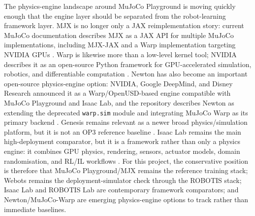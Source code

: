 The physics-engine landscape around MuJoCo Playground is moving quickly enough that the engine layer should be separated from the robot-learning framework layer. MJX is no longer only a JAX reimplementation story: current MuJoCo documentation describes MJX as a JAX API for multiple MuJoCo implementations, including MJX-JAX and a Warp implementation targeting NVIDIA GPUs \citep{GoogleDeepMind2026-mujoco-xla-mjx-documentation}. Warp is likewise more than a low-level kernel tool; NVIDIA describes it as an open-source Python framework for GPU-accelerated simulation, robotics, and differentiable computation \citep{NVIDIA2026-warp-gpu-accelerated-simulation-robotics-machine-learning}. Newton has also become an important open-source physics-engine option: NVIDIA, Google DeepMind, and Disney Research announced it as a Warp/OpenUSD-based engine compatible with MuJoCo Playground and Isaac Lab, and the repository describes Newton as extending the deprecated \texttt{warp.sim} module and integrating MuJoCo Warp as its primary backend \citep{NVIDIA2026-newton-open-source-physics-engine-robotics-simulation,NewtonPhysicsContributors2026-newton-open-source-gpu-accelerated-physics-simulation-engine}. Genesis remains relevant as a newer broad physics/simulation platform, but it is not an OP3 reference baseline \citep{GenesisAuthors2024-genesis-generative-universal-physics-engine-robotics-beyond}. Isaac Lab remains the main high-deployment comparator, but it is a framework rather than only a physics engine: it combines GPU physics, rendering, sensors, actuator models, domain randomisation, and RL/IL workflows \citep{Mittal2025-isaac-lab-gpu-accelerated-simulation-framework-multi-modal-robot-learning}. For this project, the conservative position is therefore that MuJoCo Playground/MJX remains the reference training stack; Webots remains the deployment-simulator check through the ROBOTIS stack; Isaac Lab and ROBOTIS Lab are contemporary framework comparators; and Newton/MuJoCo-Warp are emerging physics-engine options to track rather than immediate baselines.

